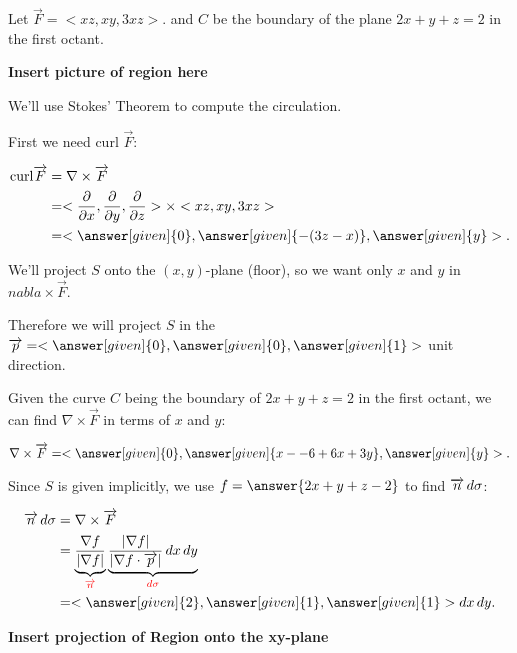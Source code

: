 \documentclass{ximera}
\begin{document}
\begin{example}
Let $\overrightarrow{F} = < xz, xy, 3xz>$. and $C$ be the boundary of the plane $2x+y+z=2$ in the first octant.

\begin{center}
{\bf Insert picture of region here}
\end{center}


We'll use Stokes' Theorem to compute the circulation.

\begin{explanation}
First we need curl $\overrightarrow{F}$:

    \begin{align*}
      \text{curl} \overrightarrow{F} &= \nabla \times \overrightarrow{F} \\
      &= <\frac{\partial}{\partial x}, \frac{\partial}{\partial y}, \frac{\partial}{\partial z}> \times <xz, xy, 3xz> \\
      &= <\answer[given]{0}, \answer[given]{-(3z-x)},\answer[given]{y}>.
    \end{align*}

We'll project $S$ onto the $(x,y)$-plane (floor), so we want only $x$ and $y$ in $nabla\times \overrightarrow{F}$.

Therefore we will project $S$ in the $\overrightarrow{p}= <\answer[given]{0}, \answer[given]{0}, \answer[given]{1}>$ unit direction.

Given the curve $C$ being the boundary of $2x + y + z = 2$ in the first octant, we can find $ \nabla \times \overrightarrow{F}$ in terms of $x$ and $y$:

\[
\nabla \times \overrightarrow{F} = <\answer[given]{0}, \answer[given]{x - -6+6x+3y},\answer[given]{y}>.
\]

Since $S$ is given implicitly, we use $f = \answer{2x  +y + z - 2}$ to find $\overrightarrow{n} \mathop{}\!d \sigma$:

    \begin{align*}
      \overrightarrow{n} \d \sigma &= \nabla \times \overrightarrow{F} \\
      &= \underbrace{\frac{\nabla f}{|\nabla f|}}_{{\color{red} \overrightarrow{n}}} \underbrace{\frac{|\nabla f|}{|\nabla f \cdot \overrightarrow{p}|} \d x \d y}_{{\color{red} \d \sigma}}\\
      &= <\answer[given]{2}, \answer[given]{1},\answer[given]{1}> \d x \d y.
    \end{align*}

{\bf Insert projection of Region onto the xy-plane}


\end{explanation}
\end{example}
\end{document}
